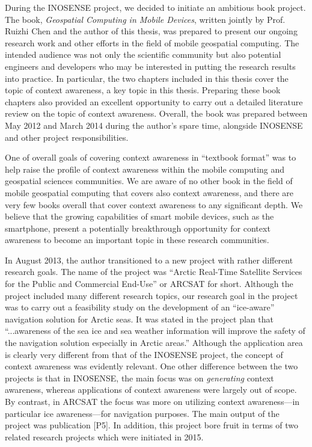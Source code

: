 During the INOSENSE project, we decided to initiate an ambitious book project. The book, \emph{Geospatial Computing in Mobile Devices}, written jointly by Prof. Ruizhi Chen and the author of this thesis, was prepared to present our ongoing research work and other efforts in the field of mobile geospatial computing. The intended audience was not only the scientific community but also potential engineers and developers who may be interested in putting the research results into practice. In particular, the two chapters included in this thesis cover the topic of context awareness, a key topic in this thesis. Preparing these book chapters also provided an excellent opportunity to carry out a detailed literature review on the topic of context awareness. Overall, the book was prepared between May 2012 and March 2014 during the author's spare time, alongside INOSENSE and other project responsibilities. 

One of overall goals of covering context awareness in ``textbook format'' was to help raise the profile of context awareness within the mobile computing and geospatial sciences communities. We are aware of no other book in the field of mobile geospatial computing that covers also context awareness, and there are very few books overall that cover context awareness to any significant depth.  We believe that the growing capabilities of smart mobile devices, such as the smartphone, present a potentially breakthrough opportunity for context awareness to become an important topic in these research communities.

In August 2013, the author transitioned to a new project with rather different research goals. The name of the project was ``Arctic Real-Time Satellite Services for the Public and Commercial End-Use'' or ARCSAT for short. Although the project included many different research topics, our research goal in the project was to carry out a feasibility study on the development of an ``ice-aware'' navigation solution for Arctic seas. It was stated in the project plan that ``...awareness of the sea ice and sea weather information will improve the safety of the navigation solution especially in Arctic areas.'' Although the application area is clearly very different from that of the INOSENSE project, the concept of context awareness was evidently relevant. One other difference between the two projects is that in INOSENSE, the main focus was on \emph{generating} context awareness, whereas applications of context awareness were largely out of scope. By contrast, in ARCSAT the focus was more on utilizing context awareness---in particular ice awareness---for navigation purposes. The main output of the project was publication [P5]. In addition, this project bore fruit in terms of two related research projects which were initiated in 2015.

